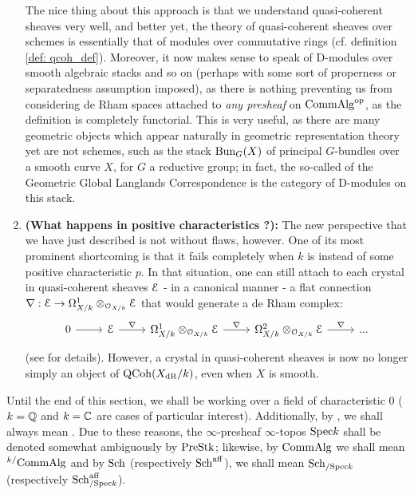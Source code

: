 \begin{enumerate}
                The nice thing about this approach is that we understand quasi-coherent sheaves very well, and better yet, the theory of quasi-coherent sheaves over schemes is essentially that of modules over commutative rings (cf. definition \ref{def: qcoh_def}). Moreover, it now makes sense to speak of D-modules over smooth algebraic stacks and so on (perhaps with some sort of properness or separatedness assumption imposed), as there is nothing preventing us from considering de Rham spaces attached to \textit{any presheaf} on $\mathrm{Comm}\mathrm{Alg}^{\mathrm{op}}$, as the definition is completely functorial. This is very useful, as there are many geometric objects which appear naturally in geometric representation theory yet are not schemes, such as the stack $\mathrm{Bun}_G(X)$ of principal $G$-bundles over a smooth curve $X$, for $G$ a reductive group; in fact, the so-called  of the Geometric Global Langlands Correspondence is the category of D-modules on this stack.
                \item \textbf{(What happens in positive characteristics ?):} The new perspective that we have just described is not without flaws, however. One of its most prominent shortcoming is that it fails completely when $k$ is instead of some positive characteristic $p$. In that situation, one can still attach to each crystal in quasi-coherent sheaves $\mathcal{E}$ - in a canonical manner - a flat connection $\nabla: \E \to \Omega^1_{X/k} \tensor_{\calO_{X/k}} \E$ that would generate a de Rham complex:
                    $$
                        \begin{tikzcd}
                        	0 & \E & {\Omega^1_{X/k} \tensor_{\calO_{X/k}} \E} & {\Omega^2_{X/k} \tensor_{\calO_{X/k}} \E} & {...}
                        	\arrow["\nabla", from=1-4, to=1-5]
                        	\arrow["\nabla", from=1-3, to=1-4]
                        	\arrow["\nabla", from=1-2, to=1-3]
                        	\arrow[from=1-1, to=1-2]
                        \end{tikzcd}
                    $$
                (see \cite[\href{https://stacks.math.columbia.edu/tag/07J5}{Tag 07J5}]{stacks} for details). However, a crystal in quasi-coherent sheaves is now no longer simply an object of $\mathrm{QCoh}(X_{\mathrm{dR}}/k)$, even when $X$ is smooth. 
            \end{enumerate}
                    
            \begin{convention}
                Until the end of this section, we shall be working over a field of characteristic $0$ ($k = \mathbb{Q}$ and $k = \mathbb{C}$ are cases of particular interest). Additionally, by , we shall always mean . Due to these reasons, the $\infty$-presheaf $\infty$-topos $\mathrm{Spec} k$ shall be denoted somewhat ambiguously by $\mathrm{Pre}\mathrm{Stk}$; likewise, by $\mathrm{Comm}\mathrm{Alg}$ we shall mean ${}^{k/}\mathrm{Comm}\mathrm{Alg}$ and by $\mathrm{Sch}$ (respectively $\mathrm{Sch}^{\mathrm{aff}}$), we shall mean $\mathrm{Sch}_{/\mathrm{Spec} k}$ (respectively $\mathrm{Sch}^{\mathrm{aff}}_{/\mathrm{Spec} k}$).
            \end{convention}
    
